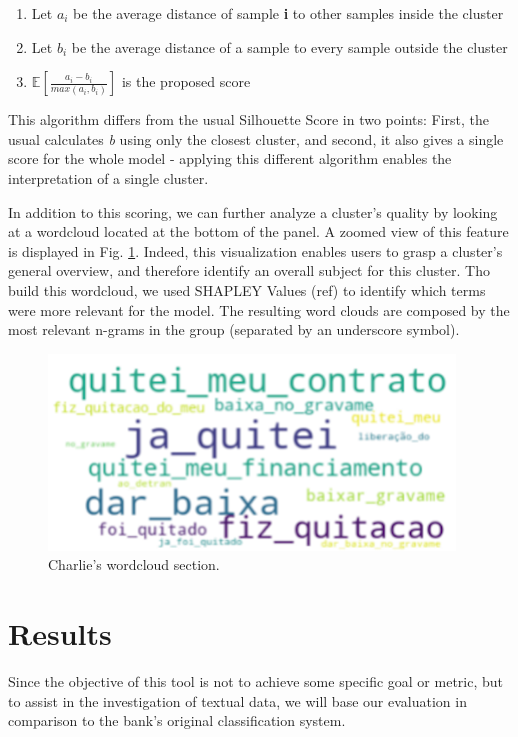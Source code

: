 \documentclass[11pt,a4paper]{article}
\newcommand{\e}[1]{{\mathbb E}\left[ #1 \right]}
\begin{document}
\begin{enumerate}
    \item Let $a_{i}$ be the average distance of sample \textbf{i} to other samples inside the cluster
    \item Let $b_{i}$ be the average distance of a sample to every sample outside the cluster
    \item $\e{\frac{a_{i}-b_{i}}{max(a_{i},b_{i})}}$ is the proposed score
\end{enumerate}

This algorithm differs from the usual Silhouette Score in two points: First, the usual calculates \textit{b} using only the closest cluster, and second, it also gives a single score for the whole model - applying this different algorithm enables the interpretation of a single cluster.

In addition to this scoring, we can further analyze a cluster's quality by looking at a wordcloud located at the bottom of the panel. A zoomed view of this feature is displayed in Fig. \ref{fig:wordcloud}. Indeed, this visualization enables users to grasp a cluster's general overview, and therefore identify an overall subject for this cluster. Tho build this wordcloud, we used SHAPLEY Values (ref) to identify which terms were more relevant for the model. The resulting word clouds are composed by the most relevant n-grams in the group (separated by an underscore symbol). 

\begin{figure}
    \centering
    \includegraphics{figures/wordcloud.png}
    \caption{Charlie's wordcloud section.}
    \label{fig:wordcloud}
\end{figure}

\section{Results}

Since the objective of this tool is not to achieve some specific goal or metric, but to assist in the investigation of textual data, we will base our evaluation in comparison to the bank's original classification system. 
\end{document}
